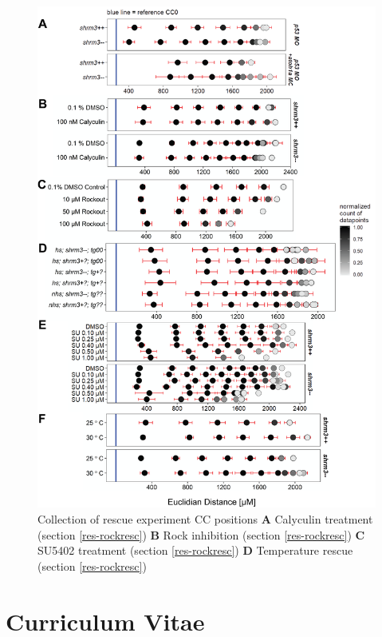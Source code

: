 \documentclass[10pt, b5paper, singlespacinge, twoside]{reedthesis} %
\theoremstyle{definition}
\theoremstyle{definition}
\theoremstyle{definition}
\theoremstyle{remark}
\begin{document}
\begin{figure}

{\centering \includegraphics[width=0.85\linewidth]{figures/supp/cc_positions} 

}

\caption[Heatshock CC positions]{Collection of rescue experiment CC positions \textbf{A} Calyculin treatment (section \ref{res-rockresc}) \textbf{B} Rock inhibition (section \ref{res-rockresc}) \textbf{C} SU5402 treatment (section \ref{res-rockresc}) \textbf{D} Temperature rescue (section \ref{res-rockresc})}\label{fig:supppos}
\end{figure}
\hypertarget{curriculum-vitae}{%
\chapter*{Curriculum Vitae}\label{curriculum-vitae}}

 \hrulefill
\vspace{0.2cm}
\end{document}

